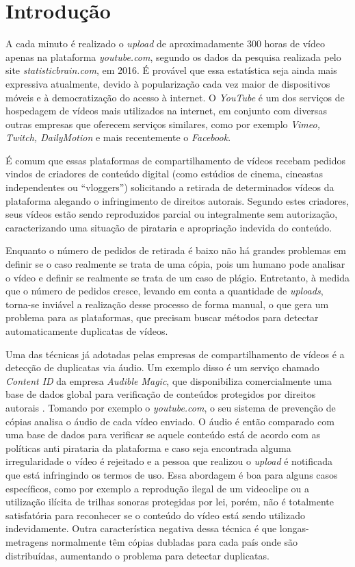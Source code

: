 \chapter{Introdução}
\label{chap:introducao}

A cada minuto é realizado o \textit{upload} de aproximadamente 300 horas de vídeo apenas na plataforma \textit{youtube.com}, segundo os dados da pesquisa realizada pelo site \textit{statisticbrain.com}, em 2016. É provável que essa estatística seja ainda mais expressiva atualmente, devido à popularização cada vez maior de dispositivos móveis e à democratização do acesso à internet. O \textit{YouTube} é um dos serviços de hospedagem de vídeos mais utilizados na internet, em conjunto com diversas outras empresas que oferecem serviços similares, como por exemplo \textit{Vimeo, Twitch, DailyMotion} e mais recentemente o \textit{Facebook}.

É comum que essas plataformas de compartilhamento de vídeos recebam pedidos vindos de criadores de conteúdo digital (como estúdios de cinema, cineastas independentes ou ``vloggers'') solicitando a retirada de determinados vídeos da plataforma alegando o infringimento de direitos autorais. Segundo estes criadores, seus vídeos estão sendo reproduzidos parcial ou integralmente sem autorização, caracterizando uma situação de pirataria e apropriação indevida do conteúdo. 

Enquanto o número de pedidos de retirada é baixo não há grandes problemas em definir se o caso realmente se trata de uma cópia, pois um humano pode analisar o vídeo e definir se realmente se trata de um caso de plágio. Entretanto, à medida que o número de pedidos cresce, levando em conta a quantidade de \textit{uploads}, torna-se inviável a realização desse processo de forma manual, o que gera um problema para as plataformas, que precisam buscar métodos para detectar automaticamente duplicatas de vídeos.

Uma das técnicas já adotadas pelas empresas de compartilhamento de vídeos é a detecção de duplicatas via áudio. Um exemplo disso é um serviço chamado \textit{Content ID} da empresa \textit{Audible Magic}, que disponibiliza comercialmente uma base de dados global para verificação de conteúdos protegidos por direitos autorais \citeauthor{audiblemagic}. Tomando por exemplo o \textit{youtube.com}, o seu sistema de prevenção de cópias analisa o áudio de cada vídeo enviado. O áudio é então comparado com uma base de dados para verificar se aquele conteúdo está de acordo com as políticas anti pirataria da plataforma e caso seja encontrada alguma irregularidade o vídeo é  rejeitado e a pessoa que realizou o \textit{upload} é notificada que está infringindo os termos de uso. Essa abordagem é boa para alguns casos específicos, como por exemplo a reprodução ilegal de um videoclipe ou a utilização ilícita de trilhas sonoras protegidas por lei, porém, não é totalmente satisfatória para reconhecer se o conteúdo do vídeo está sendo utilizado indevidamente. Outra característica negativa dessa técnica é que longas-metragens normalmente têm cópias dubladas para cada país onde são distribuídas, aumentando o problema para detectar duplicatas.

